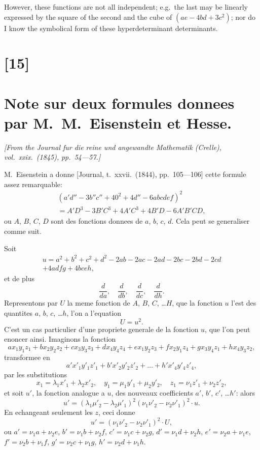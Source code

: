 \documentclass[12pt,a4paper]{article}
\begin{document}
However, these functions are not all independent; e.g.\ the last may be linearly
expressed by the square of the second and the cube of $(ae - 4bd + 3c^2)$; nor do
I know the symbolical form of these hyperdeterminant determinants.

\newpage
\section*{[15]}
\section*{Note sur deux formules donnees par M.~M.~Eisenstein et Hesse.}

\textit{[From the Journal fur die reine und angewandte Mathematik (Crelle), vol.~xxix.~(1845),}
\textit{pp.~54---57.]}

\bigskip
\setcounter{page}{113}

M.~Eisenstein a donne [Journal, t.~xxvii.~(1844), pp.~105---106] cette formule assez
remarquable:
\begin{multline*}
(a'd'' - 3b''c'' + 40^2 + 4d'' - 6abcdef)^2 \\
= A'D^3 - 3B'C^3 + 4A'C^3 + 4B'D - 6A'B'CD,
\end{multline*}
ou $A$, $B$, $C$, $D$ sont des fonctions donnees de $a$, $b$, $c$, $d$. Cela peut se generaliser comme
suit.

Soit
\begin{multline*}
u = a^2 + b^2 + c^2 + d^2 - 2ab - 2ac - 2ad - 2bc - 2bd - 2cd \\
+ 4adfg + 4bceh,
\end{multline*}
et de plus
\[
\frac{d}{da},\quad \frac{d}{db},\quad \frac{d}{dc},\quad \frac{d}{dh}.
\]
Representons par $U$ la meme fonction de $A$, $B$, $C$, \ldots $H$, que la fonction $u$ l'est des
quantites $a$, $b$, $c$, \ldots $h$, l'on a l'equation
\[
U = u^2.
\]
C'est un cas particulier d'une propriete generale de la fonction $u$, que l'on peut
enoncer ainsi. Imaginons la fonction
\[
ax_1y_1z_1 + bx_2y_2z_2 + cx_3y_3z_3 + dx_4y_4z_4 + ex_1y_2z_3 + fx_2y_1z_4 + gx_3y_4z_1 + hx_4y_3z_2,
\]
transformee en
\[
a'x'_1y'_1z'_1 + b'x'_2y'_2z'_2 + \ldots + h'x'_4y'_4z'_4,
\]
par les substitutions
\[
x_1 = \lambda_1 x'_1 + \lambda_2 x'_2,\quad
y_1 = \mu_1 y'_1 + \mu_2 y'_2,\quad
z_1 = \nu_1 z'_1 + \nu_2 z'_2,
\]
et soit $u'$, la fonction analogue a $u$, des nouveaux coefficients $a'$, $b'$, $c'$, \ldots $h'$: alors
\[
u' = (\lambda_1\mu'_2 - \lambda_2\mu'_1)^2 (\nu_1\nu'_2 - \nu_2\nu'_1)^2 \cdot u.
\]
En echangeant seulement les $z$, ceci donne
\[
u' = (\nu_1\nu'_2 - \nu_2\nu'_1)^2 \cdot U,
\]
ou $a' = \nu_1 a + \nu_2 e$, $b' = \nu_1 b + \nu_2 f$, $c' = \nu_1 c + \nu_2 g$, $d' = \nu_1 d + \nu_2 h$,
$e' = \nu_2 a + \nu_1 e$, $f' = \nu_2 b + \nu_1 f$, $g' = \nu_2 c + \nu_1 g$, $h' = \nu_2 d + \nu_1 h$.
\end{document}
